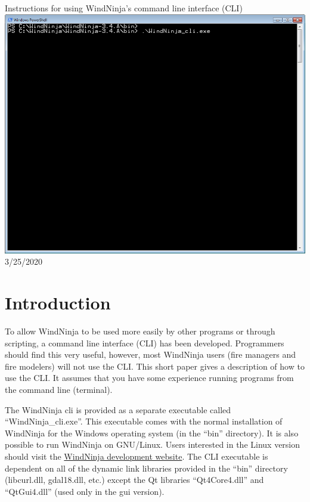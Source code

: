 \documentclass[12pt]{article}
\begin{document}
\begin{titlepage}
    \centering
    {\Huge
       Instructions for using WindNinja's command line interface (CLI)
    }    
    \vfill
    \includegraphics[scale=0.75]{cli-0}
    \vfill
  	{\Huge
	  3/25/2020 %
  	}
    \vfill
\end{titlepage}
\section*{Introduction}
To allow WindNinja to be used more easily by other programs or through scripting, a command line interface (CLI) has been developed.  Programmers should find this very useful, however, most WindNinja users (fire managers and fire modelers) will not use the CLI.  This short paper gives a description of how to use the CLI.  It assumes that you have some experience running programs from the command line (terminal).

The WindNinja cli is provided as a separate executable called “WindNinja\_cli.exe”.  This executable comes with the normal installation of WindNinja for the Windows operating system (in the “bin” directory).  It is also possible to run WindNinja on GNU/Linux.  Users interested in the Linux version should %
visit the \href{https://github.com/firelab/github}{WindNinja development website}. 
The CLI executable is dependent on all of the dynamic link libraries provided in the “bin” directory (libcurl.dll, gdal18.dll, etc.) except the Qt libraries “Qt4Core4.dll” and “QtGui4.dll” (used only in the gui version).
\end{document}

